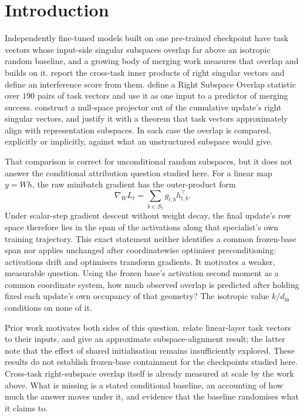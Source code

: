 \section{Introduction}

Independently fine-tuned models built on one pre-trained checkpoint have task vectors whose
input-side singular subspaces overlap far above an isotropic random baseline, and a growing body
of merging work measures that overlap and builds on it.
\citet{gargiulo2025task} report the cross-task inner products of right singular vectors and
define an interference score from them.
\citet{demystify2026} define a Right Subspace Overlap statistic over $190$ pairs of task vectors
and use it as one input to a predictor of merging success.
\citet{qiu2026nufilt} construct a null-space projector out of the cumulative update's right
singular vectors, and justify it with a theorem that task vectors approximately align with
representation subspaces.
In each case the overlap is compared, explicitly or implicitly, against what an unstructured
subspace would give.

That comparison is correct for unconditional random subspaces, but it does not answer the
conditional attribution question studied here. For a linear map $y=Wh$, the raw minibatch
gradient has the outer-product form
\begin{equation}
 \nabla_W L_t=\sum_{b\in\mathcal B_t}g_{t,b}h_{t,b}^\top.
 \label{eq:outer-product}
\end{equation}
Under scalar-step gradient descent without weight decay, the final update's row space therefore
lies in the span of the activations along that specialist's own training trajectory. This exact statement neither
identifies a common frozen-base span nor applies unchanged after coordinatewise optimiser
preconditioning: activations drift and optimisers transform gradients. It motivates a weaker,
measurable question. Using the frozen base's activation second moment as a common coordinate
system, how much observed overlap is predicted after holding fixed each update's own occupancy
of that geometry? The isotropic value $k/d_{\mathrm{in}}$ conditions on none of it.

Prior work motivates both sides of this question. \citet{cheng2025wudi} relate linear-layer task
vectors to their inputs, and \citet{qiu2026nufilt} give an approximate subspace-alignment result;
the latter note that the effect of shared initialisation remains insufficiently explored. These
results do not establish frozen-base containment for the checkpoints studied here. Cross-task
right-subspace overlap itself is already measured at scale by the work above. What is missing is
a stated conditional baseline, an accounting of how much the answer moves under it, and evidence
that the baseline randomises what it claims to.

